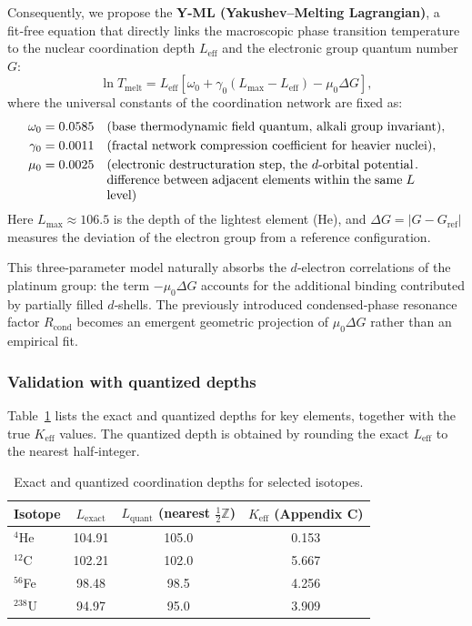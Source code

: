 \documentclass[12pt,a4paper]{article}
\begin{document}
	Consequently, we propose the \textbf{Y-ML (Yakushev–Melting Lagrangian)}, a fit‑free equation that directly links the macroscopic phase transition temperature to the nuclear coordination depth \(L_{\mathrm{eff}}\) and the electronic group quantum number \(G\):
	\begin{equation}
		\boxed{\ln T_{\mathrm{melt}} = L_{\mathrm{eff}} \left[ \omega_0 + \gamma_0 (L_{\mathrm{max}} - L_{\mathrm{eff}}) - \mu_0 \Delta G \right]},
		\label{eq:YML}
	\end{equation}
	where the universal constants of the coordination network are fixed as:
	\begin{align}
		\omega_0 &= 0.0585 \quad \text{(base thermodynamic field quantum, alkali group invariant)},\\
		\gamma_0 &= 0.0011 \quad \text{(fractal network compression coefficient for heavier nuclei)},\\
		\mu_0   &= 0.0025 \quad 
		\parbox[t]{0.7\textwidth}{%
			(electronic destructuration step, the $d$‑orbital potential \\
			difference between adjacent elements within the same $L$ level)}.
	\end{align}
	Here \(L_{\mathrm{max}} \approx 106.5\) is the depth of the lightest element (He), and \(\Delta G = |G - G_{\text{ref}}|\) measures the deviation of the electron group from a reference configuration.
	
	This three‑parameter model naturally absorbs the \(d\)‑electron correlations of the platinum group: the term \(-\mu_0 \Delta G\) accounts for the additional binding contributed by partially filled \(d\)‑shells. The previously introduced condensed‑phase resonance factor \(R_{\text{cond}}\) becomes an emergent geometric projection of \(\mu_0 \Delta G\) rather than an empirical fit.
	
	\subsubsection{Validation with quantized depths}
	Table~\ref{tab:L_quant} lists the exact and quantized depths for key elements, together with the true \(K_{\mathrm{eff}}\) values. The quantized depth is obtained by rounding the exact \(L_{\mathrm{eff}}\) to the nearest half‑integer.
	
	\begin{table}[htbp]
		\centering
		\caption{Exact and quantized coordination depths for selected isotopes.}
		\label{tab:L_quant}
		\begin{tabular}{@{}lccc@{}}
			\toprule
			Isotope & \(L_{\mathrm{exact}}\) & \(L_{\mathrm{quant}}\) (nearest \(\frac12\mathbb{Z}\)) & \(K_{\mathrm{eff}}\) (Appendix C) \\
			\midrule
			$^{4}$He & 104.91 & 105.0 & 0.153 \\
			$^{12}$C & 102.21 & 102.0 & 5.667 \\
			$^{56}$Fe & 98.48 & 98.5 & 4.256 \\
			$^{238}$U & 94.97 & 95.0 & 3.909 \\
			\bottomrule
		\end{tabular}
	\end{table}
	
\end{document}
